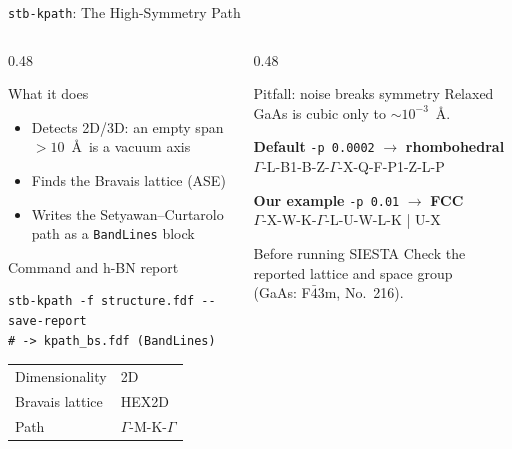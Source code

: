 \documentclass[8pt]{beamer}
\begin{document}
\begin{frame}[fragile]{\texttt{stb-kpath}: The High-Symmetry Path}
	\begin{columns}[T]
		\begin{column}{0.48\textwidth}
			\begin{block}{What it does}
				\small
				\begin{itemize}
					\item Detects 2D/3D: an empty span $>10$~\AA\ is a vacuum axis
					\item Finds the Bravais lattice (ASE)
					\item Writes the Setyawan--Curtarolo path as a \texttt{BandLines} block
				\end{itemize}
			\end{block}
			\vspace{0.1cm}
			\begin{block}{Command and h-BN report}
				\small
\begin{verbatim}
stb-kpath -f structure.fdf --save-report
# -> kpath_bs.fdf (BandLines)
\end{verbatim}
				\vspace{-0.1cm}
				{\ttfamily
				\begin{tabular}{@{}l@{\,:\,}l}
					Dimensionality & 2D\\
					Bravais lattice & HEX2D\\
					Path & $\Gamma$-M-K-$\Gamma$
				\end{tabular}}
			\end{block}
		\end{column}
		\begin{column}{0.48\textwidth}
			\begin{alertblock}{Pitfall: noise breaks symmetry}
				\small
				Relaxed GaAs is cubic only to $\sim10^{-3}$~\AA.
				\par\vspace{0.2cm}
				\textbf{Default} \texttt{-p 0.0002} $\rightarrow$ \textbf{rhombohedral}\\
				{\small\ttfamily $\Gamma$-L-B1-B-Z-$\Gamma$-X-Q-F-P1-Z-L-P}
				\par\vspace{0.2cm}
				\textbf{Our example} \texttt{-p 0.01} $\rightarrow$ \textbf{FCC}\\
				{\small\ttfamily $\Gamma$-X-W-K-$\Gamma$-L-U-W-L-K | U-X}
			\end{alertblock}
			\vspace{0.1cm}
			\begin{block}{Before running SIESTA}
				\small
				Check the reported lattice and space group\\
				(GaAs: F$\bar{4}$3m, No.\ 216).
			\end{block}
		\end{column}
	\end{columns}
\end{frame}
\end{document}
